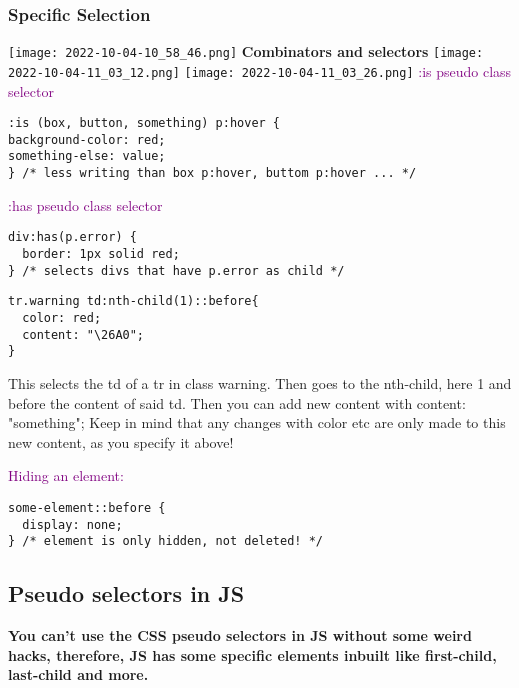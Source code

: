 \documentclass[main.tex,fontsize=6pt,paper=a4,paper=landscape,DIV=calc,]{scrartcl}
\begin{document}
\begin{multicols*}{4}
\subsubsection{Specific Selection}
\texttt{[image: 2022-10-04-10\_58\_46.png]}
\textbf{Combinators and selectors}  
\texttt{[image: 2022-10-04-11\_03\_12.png]}\newline 
\texttt{[image: 2022-10-04-11\_03\_26.png]}\newline
\textcolor{purple}{:is pseudo class selector}
\vspace{-2mm}
\begin{lstlisting}
:is (box, button, something) p:hover {
background-color: red;
something-else: value;
} /* less writing than box p:hover, buttom p:hover ... */
\end{lstlisting}
\vspace{2mm}
\textcolor{purple}{:has pseudo class selector}
\vspace{-2mm}
\begin{lstlisting}
div:has(p.error) {
  border: 1px solid red;
} /* selects divs that have p.error as child */
\end{lstlisting}
\vspace{2mm}
\vspace{-2mm}
\begin{lstlisting}
tr.warning td:nth-child(1)::before{
  color: red;
  content: "\26A0";
}
\end{lstlisting}
\vspace{2mm}
 This selects the td of a tr in class warning. Then goes to the nth-child, here 1 and before the content of said td.\newline
Then you can add new content with content: "something";\newline
Keep in mind that any changes with color etc are only made to this new content, as you specify it above!\newline

\textcolor{purple}{Hiding an element:}
\vspace{-2mm}
\begin{lstlisting}
some-element::before {
  display: none;
} /* element is only hidden, not deleted! */
\end{lstlisting}
\vspace{2mm}

 \subsection{Pseudo selectors in JS}  
\textbf{You can't use the CSS pseudo selectors in JS without some weird hacks, therefore, JS has some specific elements inbuilt like first-child, last-child and more.}


\end{multicols*}
\end{document}
